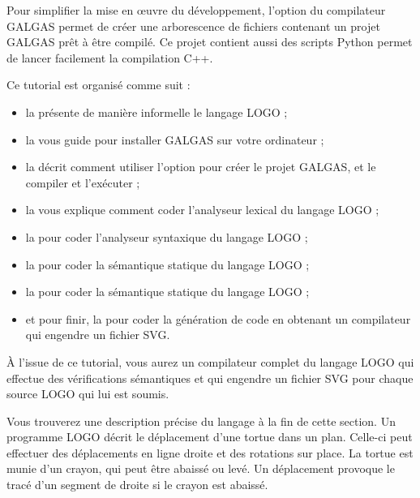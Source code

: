Pour simplifier la mise en œuvre du développement, l'option  du compilateur GALGAS permet de créer une arborescence de fichiers contenant un projet GALGAS prêt à être compilé. Ce projet contient aussi des scripts Python permet de lancer facilement la compilation C++.

Ce tutorial est organisé comme suit :
\begin{itemize}
  \item la  présente de manière informelle le langage LOGO ;
  \item la  vous guide pour installer GALGAS sur votre ordinateur ;
  \item la  décrit comment utiliser l'option  pour créer le projet GALGAS, et le compiler et l'exécuter ;
  \item la  vous explique comment coder l'analyseur lexical du langage LOGO ;
  \item la  pour coder l'analyseur syntaxique du langage LOGO ;
  \item la  pour coder la sémantique statique du langage LOGO ;
  \item la  pour coder la sémantique statique du langage LOGO ;
  \item et pour finir, la  pour coder la génération de code en obtenant un compilateur qui engendre un fichier SVG.
\end{itemize}

À l'issue de ce tutorial, vous aurez un compilateur complet  du langage LOGO qui effectue des vérifications sémantiques et qui engendre un fichier SVG pour chaque source LOGO qui lui est soumis.







Vous trouverez une description précise du langage à la fin de cette section. Un programme LOGO décrit le déplacement d'une tortue dans un plan. Celle-ci peut effectuer des déplacements en ligne droite et des rotations sur place. La tortue est munie d'un crayon, qui peut être abaissé ou levé. Un déplacement provoque le tracé d'un segment de droite si le crayon est abaissé.

